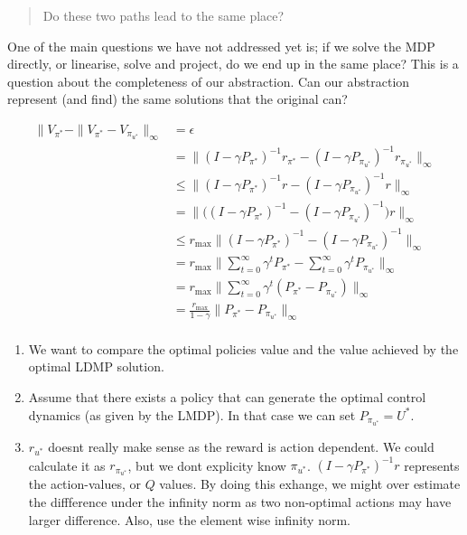 \begin{quote}
Do these two paths lead to the same place?
\end{quote}

One of the main questions we have not addressed yet is; if we solve the
MDP directly, or linearise, solve and project, do we end up in the same
place? This is a question about the completeness of our abstraction. Can
our abstraction represent (and find) the same solutions that the
original can?

\begin{align}
\parallel V_{\pi^{* }} - \parallel V_{\pi^{* }} - V_{\pi_{u^{* }}} \parallel_{\infty}&= \epsilon  \tag{1}\\
&=\parallel (I - \gamma P_{\pi^{* }})^{-1}r_{\pi^{* }} - (I - \gamma P_{\pi_{u^{* }}})^{-1}r_{\pi_{u^{* } }} \parallel_{\infty} \tag{2}\\
&\le\parallel (I - \gamma P_{\pi^{* }})^{-1}r - (I - \gamma P_{\pi_{u^{* }}})^{-1}r \parallel_{\infty} \tag{3}\\
&=\parallel \bigg((I - \gamma P_{\pi^{* }})^{-1} - (I - \gamma P_{\pi_{u^{* }}})^{-1} \bigg) r \parallel_{\infty} \tag{4}\\
&\le r_{\text{max}} \parallel (I - \gamma P_{\pi^{* }})^{-1} - (I - \gamma P_{\pi_{u^{* }}})^{-1}   \parallel_{\infty} \tag{5}\\
&= r_{\text{max}} \parallel \sum_{t=0}^{\infty} \gamma^t P_{\pi^{* }} - \sum_{t=0}^{\infty} \gamma^t P_{\pi_{u^{* }}}  \parallel_{\infty} \tag{6}\\
&= r_{\text{max}} \parallel \sum_{t=0}^{\infty} \gamma^t (P_{\pi^{* }} - P_{\pi_{u^{* }}})   \parallel_{\infty} \tag{7}\\
&= \frac{r_{\text{max}}}{1-\gamma} \parallel P_{\pi^{* }} - P_{\pi_{u^{* }}} \parallel_{\infty} \tag{7}\\
\end{align}

\begin{enumerate}
\def\labelenumi{(\arabic{enumi})}
\tightlist
\item
  We want to compare the optimal policies value and the value achieved
  by the optimal LDMP solution.
\item
  Assume that there exists a policy that can generate the optimal
  control dynamics (as given by the LMDP). In that case we can set
  \(P_{\pi_{u^{* }}} = U^{* }\).
\item
  \(r_{u^{* }}\) doesnt really make sense as the reward is action
  dependent. We could calculate it as \(r_{\pi_{u^{* } }}\), but we dont
  explicity know \(\pi_{u^{* }}\). \((I - \gamma P_{\pi^{* }})^{-1}r\)
  represents the action-values, or \(Q\) values. By doing this exhange,
  we might over estimate the diffference under the infinity norm as two
  non-optimal actions may have larger difference. Also, use the element
  wise infinity norm.
\end{enumerate}

